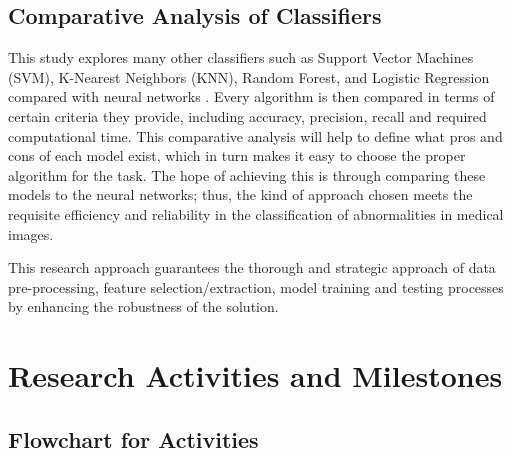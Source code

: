 \documentclass[a4paper, 12pt]{article}
\begin{document}
\subsection{ Comparative Analysis of Classifiers }

This study explores many other classifiers such as Support Vector Machines (SVM), K-Nearest Neighbors (KNN), Random Forest, and Logistic Regression compared with neural networks . Every algorithm is then compared in terms of certain criteria they provide, including accuracy, precision, recall and required computational time. This comparative analysis will help to define what pros and cons of each model exist, which in turn makes it easy to choose the proper algorithm for the task. The hope of achieving this is through comparing these models to the neural networks; thus, the kind of approach chosen meets the requisite efficiency and reliability in the classification of abnormalities in medical images.

This research approach guarantees the thorough and strategic approach of data pre-processing, feature selection/extraction, model training and testing processes by enhancing the robustness of the solution.

\clearpage

\section{Research Activities and Milestones}

\subsection{Flowchart for Activities}
\end{document}

